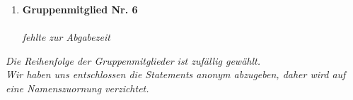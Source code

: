 \documentclass[a4paper]{article}
\begin{document}
\begin{enumerate}
    \item \textbf{Gruppenmitglied Nr. 6}\\
    \\
    \textit{fehlte zur Abgabezeit}
    \\

\end{enumerate}

\textit{Die Reihenfolge der Gruppenmitglieder ist zufällig gewählt.}\\
\textit{Wir haben uns entschlossen die Statements anonym abzugeben, daher wird auf eine Namenszuornung verzichtet.}

\end{document}
